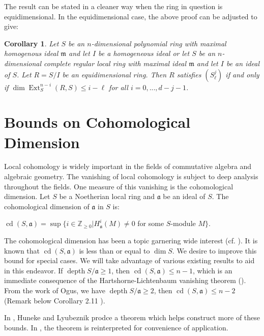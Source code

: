 \documentclass[11pt]{amsart}
\numberwithin{equation}{section}
\newtheorem{cor}[theorem]{Corollary}
\theoremstyle{definition}
\theoremstyle{remark}
\newcommand{\cd}{\operatorname{cd}}
\newcommand{\Ext}{\operatorname{Ext}}
\newcommand{\depth}{\operatorname{depth}}
\begin{document}
The result can be stated in a cleaner way when the ring in question is equidimensional.  In the equidimensional case, the above proof can be adjusted to give:

\begin{cor}
Let $S$ be an $n$-dimensional polynomial ring with maximal homogenous ideal $\mathfrak{m}$ and let $I$ be a homogeneous ideal or let $S$ be an $n$-dimensional complete regular local ring with maximal ideal $\mathfrak{m}$ and let $I$ be an ideal of $S$.  Let  $R=S/I$ be an equidimensional ring.  Then $R$ satisfies $(S_{\ell}^j)$ if and only if $\dim \Ext _S ^{n-i} (R,S) \leq i-\ell$ for all $i = 0,...,d-j-1$.
\end{cor}


\section{Bounds on Cohomological Dimension}

Local cohomology is widely important in the fields of commutative algebra and algebraic geometry. The vanishing of local cohomology is subject to deep analysis throughout the fields. One measure of this vanishing is the cohomological dimension. Let $S$ be a Noetherian local ring and $\mathfrak{a}$ be an ideal of $S$. The cohomological dimension of $\mathfrak{a}$ in $S$ is:

\begin{center}
$\cd (S,\mathfrak{a}) = \sup \{ i \in \mathds{Z} _{\geq 0} | H_\mathfrak{a} ^i (M) \neq 0 $ for some $S$-module $M \}$.
\end{center}

The cohomological dimension has been a topic garnering wide interest (cf. \cite{Ha68, Og73, PS73, HL90, Ly93, Va13, DT16}). It is known that $\cd (S,\mathfrak{a})$ is less than or equal to $\dim S$. We desire to improve this bound for special cases.  We will take advantage of various existing results to aid in this endeavor.  If $\depth S/\mathfrak{a} \geq 1$, then $\cd (S, \mathfrak{a}) \leq n-1$, which is
an immediate consequence of the Hartshorne-Lichtenbaum vanishing theorem (\cite[Theorem 3.1]{Ha68}). From the work of Ogus, we have $\depth S/\mathfrak{a} \geq 2$, then $\cd(S, \mathfrak{a}) \leq n-2$ (Remark below Corollary 2.11 \cite{Og73}).

In \cite{HL90}, Huneke and Lyubeznik prodce a theorem which helps construct more of these bounds. In \cite{DT16}, the theorem is reinterpreted for convenience of application.
\end{document}
